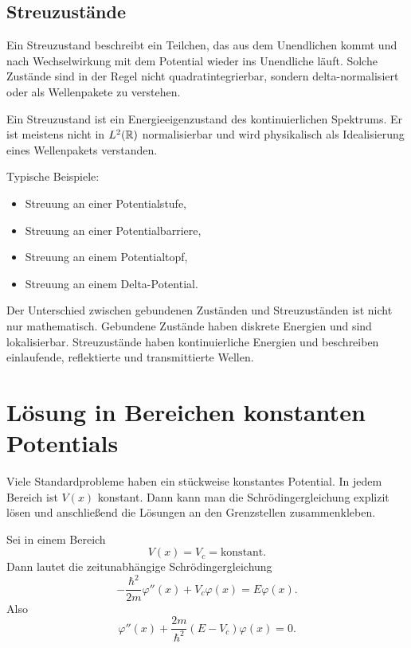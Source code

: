 \subsection{Streuzustände}

Ein Streuzustand beschreibt ein Teilchen, das aus dem Unendlichen kommt und nach Wechselwirkung mit dem Potential wieder ins Unendliche läuft. Solche Zustände sind in der Regel nicht quadratintegrierbar, sondern delta-normalisiert oder als Wellenpakete zu verstehen.

\begin{definitionbox}
Ein Streuzustand ist ein Energieeigenzustand des kontinuierlichen Spektrums. Er ist meistens nicht in $L^2(\mathbb{R})$ normalisierbar und wird physikalisch als Idealisierung eines Wellenpakets verstanden.
\end{definitionbox}

Typische Beispiele:
\begin{itemize}
    \item Streuung an einer Potentialstufe,
    \item Streuung an einer Potentialbarriere,
    \item Streuung an einem Potentialtopf,
    \item Streuung an einem Delta-Potential.
\end{itemize}

\begin{conceptbox}
Der Unterschied zwischen gebundenen Zuständen und Streuzuständen ist nicht nur mathematisch. Gebundene Zustände haben diskrete Energien und sind lokalisierbar. Streuzustände haben kontinuierliche Energien und beschreiben einlaufende, reflektierte und transmittierte Wellen.
\end{conceptbox}

\section{Lösung in Bereichen konstanten Potentials}

Viele Standardprobleme haben ein stückweise konstantes Potential. In jedem Bereich ist $V(x)$ konstant. Dann kann man die Schrödingergleichung explizit lösen und anschließend die Lösungen an den Grenzstellen zusammenkleben.

Sei in einem Bereich
\[
    V(x)=V_c=\text{konstant}.
\]
Dann lautet die zeitunabhängige Schrödingergleichung
\[
    -\frac{\hbar^2}{2m}\varphi''(x)+V_c\varphi(x)=E\varphi(x).
\]
Also
\[
    \varphi''(x)+\frac{2m}{\hbar^2}(E-V_c)\varphi(x)=0.
\]

